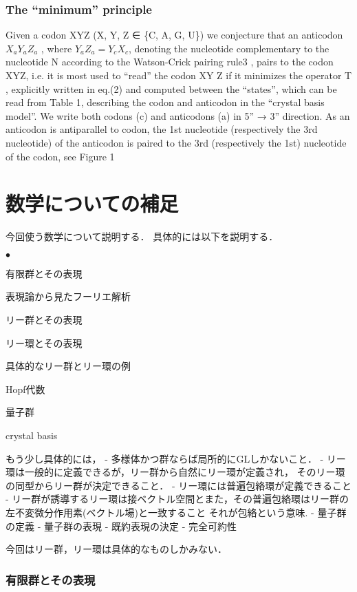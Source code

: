 \documentclass{ujarticle}
\renewenvironment{itemize}%
{%
   \begin{list}{\parbox{1zw}{$\bullet$}}%
   {%
      \setlength{\topsep}{0zh}
      \setlength{\itemindent}{0zw}
      \setlength{\leftmargin}{2zw}%
      \setlength{\rightmargin}{0zw}%
      \setlength{\labelsep}{1zw}%
      \setlength{\labelwidth}{3zw}%
      \setlength{\itemsep}{0em}%
      \setlength{\parsep}{0em}%
      \setlength{\listparindent}{0zw}%
   }
}{%
   \end{list}%
}
\begin{document}
\section{The “minimum” principle}
\label{sec:The “minimum” principle}
Given a codon XYZ (X, Y, Z ∈ \{C, A, G, U\})
we conjecture that an anticodon $X_aY_aZ_a$
, where
$Y_aZ_a = Y_cX_c$, denoting the nucleotide complementary
to the nucleotide N according to the Watson-Crick pairing rule3
, pairs to the codon XYZ, i.e. it is most used to “read” the codon XY Z
if it minimizes the operator T , explicitly written in eq.(2) and computed between the “states”, which
can be read from Table 1, describing the codon and anticodon in the “crystal basis model”. We write
both codons (c) and anticodons (a) in 5” → 3” direction. As an anticodon is antiparallel to codon,
the 1st nucleotide (respectively the 3rd nucleotide) of the anticodon is paired to the 3rd (respectively
the 1st) nucleotide of the codon, see Figure 1


\part{数学についての補足}
\label{pa:数学についての補足}

今回使う数学について説明する．
具体的には以下を説明する．
\begin{itemize}
  \item 有限群とその表現
  \item 表現論から見たフーリエ解析
  \item リー群とその表現
  \item リー環とその表現
  \item 具体的なリー群とリー環の例
  \item Hopf代数
  \item 量子群
  \item crystal basis
\end{itemize}
もう少し具体的には，
- 多様体かつ群ならば局所的にGLしかないこと．
- リー環は一般的に定義できるが，リー群から自然にリー環が定義され，
そのリー環の同型からリー群が決定できること．
- リー環には普遍包絡環が定義できること
- リー群が誘導するリー環は接ベクトル空間とまた，その普遍包絡環はリー群の左不変微分作用素(ベクトル場)と一致すること
それが包絡という意味.
- 量子群の定義
- 量子群の表現
  - 既約表現の決定
  - 完全可約性

今回はリー群，リー環は具体的なものしかみない．

\section{有限群とその表現}
\label{sec:有限群とその表現}
\end{document}
